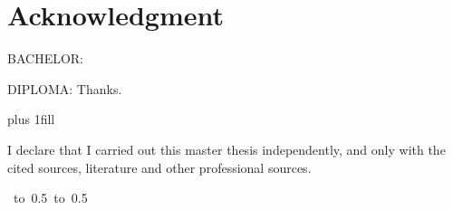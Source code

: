 \chapter*{Acknowledgment}

BACHELOR:


DIPLOMA:
Thanks.
\todo{}

\vglue 0pt plus 1fill

\noindent
I declare that I carried out this master thesis independently, and only with the cited
sources, literature and other professional sources.


\vspace{10mm}

\hbox{
	\hbox to 0.5
	\hbox to 0.5
	}

\newpage
